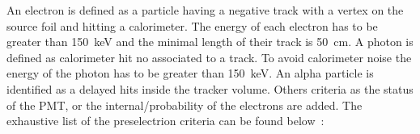 \documentclass[main.tex]{subfiles}
\begin{document}
\bigskip 

\NI An electron is defined as a particle having a negative track with a vertex on the source foil and hitting a calorimeter. The energy of each electron has to be greater than 150~keV and the minimal length of their track is 50~cm. A photon is defined as calorimeter hit no associated to a track. To avoid calorimeter noise the energy of the photon has to be greater than 150~keV. An alpha particle is identified as a delayed hits inside the tracker volume. Others criteria as the status of the PMT, or the internal/probability of the electrons are added. The exhaustive list of the preselectrion criteria can be found below~:


\end{document}
